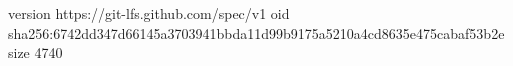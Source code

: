 version https://git-lfs.github.com/spec/v1
oid sha256:6742dd347d66145a3703941bbda11d99b9175a5210a4cd8635e475cabaf53b2e
size 4740
